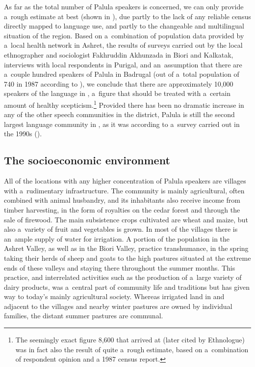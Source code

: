 As far as the total number of Palula speakers is concerned, we can only provide a~rough estimate at
best (shown in ), due partly to the lack of any reliable census directly mapped
to language use, and partly to the changeable and multilingual situation of the region. Based on
a~combination of population data provided by a~local health network in Ashret, the results of
surveys carried out by the local ethnographer and sociologist Fakhruddin Akhunzada in Biori and Kalkatak,
interviews with local respondents in Purigal, and an~assumption that there are a~couple hundred
speakers of Palula in Badrugal (out of a~total population of 740 in 1987 according to
\citealt[143]{decker1992a}), we conclude that there are approximately 10,000 speakers of the
language in \iliChitral, a~figure that should be treated with a~certain amount of healthy
scepticism.\footnote{The seemingly exact figure 8,600 that \citep[74--76]{decker1992a} arrived at
  (later cited by Ethnologue) was in fact also the result of quite a~rough estimate, based on
  a~combination of respondent opinion and a 1987 census report.} Provided there has been no dramatic increase in any of the other speech communities in the district, Palula is still the second largest language community in \iliChitral, as it was according to a~survey carried out in the 1990s (\citealt[11]{decker1992a}). 

\subsection{The socioeconomic environment}
\label{subsec:1-2-2}

All of the locations with any higher concentration of Palula speakers are villages with a~rudimentary infrastructure. The community is mainly agricultural, often combined with animal husbandry, and its inhabitants also receive income from timber harvesting, in the form of royalties on the cedar forest and through the sale of firewood. The main subsistence crops cultivated are wheat and maize, but also a~variety of fruit and vegetables is grown. In most of the villages there is an~ample supply of water for irrigation. A portion of the population in the Ashret Valley, as well as in the Biori Valley, practice transhumance, in the spring taking their herds of sheep and goats to the high pastures situated at the extreme ends of these valleys and staying there throughout the summer months. This practice, and interrelated activities such as the production of a~large variety of dairy products, was a~central part of community life and traditions but has given way to today's mainly agricultural society. Whereas irrigated land in and adjacent to the villages and nearby winter pastures are owned by individual families, the distant summer pastures are communal.


